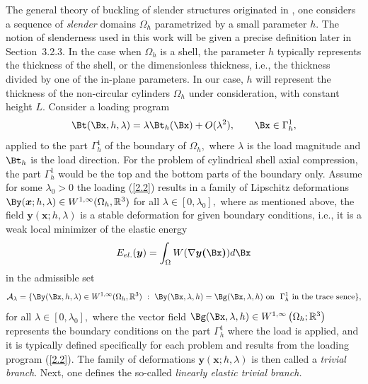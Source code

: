 The general theory of buckling of slender structures originated in \cite{bib:Gra.Tru.}, one considers a sequence of \textit{slender} domains $\Omega_h$ parametrized by a small parameter $h$. The notion of slenderness used in this work will be given a precise definition later in Section~3.2.3. In the case when $\Omega_h$ is a shell, the parameter $h$ typically represents the thickness of the shell, or the dimensionless thickness, i.e., the thickness divided by one of the in-plane parameters. In our case, $h$ will represent the thickness of the non-circular cylinders $\Omega_h$ under consideration, with constant height $L$. Consider a loading program 
\begin{equation}
\label{2.2}
\Bt(\Bx,h,\lambda)=\lambda \Bt_h(\Bx)+O(\lambda^2),\qquad \Bx\in \Gamma^1_h,
\end{equation}
applied to the part $\Gamma^1_h$ of the boundary of $\Omega_h,$ where $\lambda$ is the load magnitude and $\Bt_h$ is the load direction. 
For the problem of cylindrical shell axial compression, the part $\Gamma^1_h$ would be the top and the bottom parts of the boundary only. 
Assume for some $\lambda_0>0$ the loading (\ref{2.2}) results in a family of Lipschitz deformations $\By (\bm x;h,\lambda)\in W^{1,\infty}(\Omega_h,\mathbb R^3)$ for all $\lambda\in[0,\lambda_0],$ where as mentioned above, the field $\bm y (\bm x;h,\lambda)$ is a stable deformation for given boundary conditions, i.e., it is a weak local minimizer of the elastic energy 
$$E_{el.}(\boldsymbol{y})=\int_{\Omega} W(\nabla \boldsymbol{y(\Bx)}) d \Bx$$
in the admissible set 
\begin{equation}
\label{2.3}
\mathcal{A}_\lambda=\{ \By(\Bx,h,\lambda)\in W^{1,\infty}(\Omega_h,\mathbb R^3) \ : 
\ \By(\Bx,\lambda,h)=\Bg(\Bx,\lambda,h)  \ \text{on}\  \ \Gamma^1_h  \ \text{in the trace sence}\},
\end{equation}
for all $\lambda\in [0,\lambda_0],$ where the vector field $\Bg(\Bx,\lambda,h)\in W^{1,\infty}\left(\Omega_{h}; \mathbb{R}^{3}\right)$ represents the boundary conditions on the part $\Gamma^1_h$ where the load is applied, and it is typically defined specifically for each problem and results from the loading program (\ref{2.2}). The family of deformations $\bm y (\bm x;h,\lambda)$ is then called a \textit{trivial branch}. Next, one defines the so-called \textit{linearly elastic trivial branch.}

